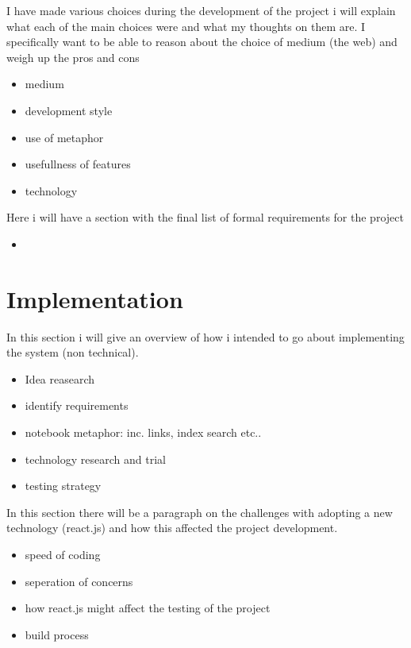 \documentclass[a4paper, 11pt]{article}
\begin{document}
I have made various choices during the development of the project i will explain
what each of the main choices were and what my thoughts on them are. I
specifically want to be able to reason about the choice of medium (the web) and
weigh up the pros and cons

\begin{itemize}
  \item{medium}
  \item{development style}
  \item{use of metaphor}
  \item{usefullness of features}
  \item{technology}
\end{itemize}

Here i will have a section with the final list of formal requirements for the
project

\begin{itemize}
  \item{}
\end{itemize}

\section{Implementation}

In this section i will give an overview of how i intended to go about
implementing the system (non technical).

\begin{itemize}
  \item{Idea reasearch}
  \item{identify requirements}
  \item{notebook metaphor: inc. links, index search etc..}
  \item{technology research and trial}
  \item{testing strategy}
\end{itemize}

In this section there will be a paragraph on the challenges with adopting a new
technology (react.js) and how this affected the project development.

\begin{itemize}
  \item{speed of coding}
  \item{seperation of concerns}
  \item{how react.js might affect the testing of the project}
  \item{build process}
\end{itemize}
\end{document}

